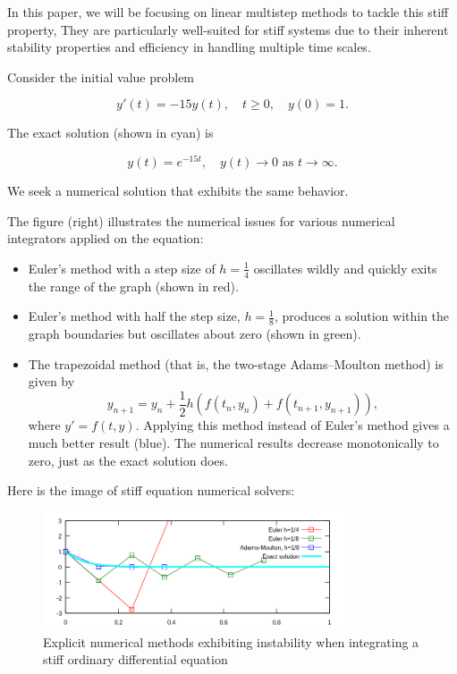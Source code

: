 In this paper, we will be focusing on linear multistep methods to tackle this stiff property,  They are particularly well-suited for stiff systems due to their inherent stability properties and efficiency in handling multiple time scales.





Consider the initial value problem

\[
y'(t) = -15y(t), \quad t \geq 0, \quad y(0) = 1. \tag{1}
\]

The exact solution (shown in cyan) is

\[
y(t) = e^{-15t}, \quad y(t) \rightarrow 0 \text{ as } t \rightarrow \infty. \tag{2}
\]

We seek a numerical solution that exhibits the same behavior.

The figure (right) illustrates the numerical issues for various numerical integrators applied on the equation:
\begin{itemize}
    \item Euler's method with a step size of $h = \frac{1}{4}$ oscillates wildly and quickly exits the range of the graph (shown in red).
    \item Euler's method with half the step size, $h = \frac{1}{8}$, produces a solution within the graph boundaries but oscillates about zero (shown in green).
    \item The trapezoidal method (that is, the two-stage Adams–Moulton method) is given by
    \[
    y_{n+1} = y_{n} + \frac{1}{2}h \left( f(t_{n},y_{n}) + f(t_{n+1},y_{n+1}) \right),
    \]
    where $y' = f(t,y)$. Applying this method instead of Euler's method gives a much better result (blue). The numerical results decrease monotonically to zero, just as the exact solution does.
\end{itemize}

Here is the image of stiff equation numerical solvers:

\begin{figure}[htbp]
  \centering
  \includegraphics[width=0.8\textwidth]{chapters/2/StiffEquationNumericalSolvers.svg.png}
  \caption{Explicit numerical methods exhibiting instability when integrating a stiff ordinary differential equation}
  \label{fig:stiff_equation}
\end{figure}


